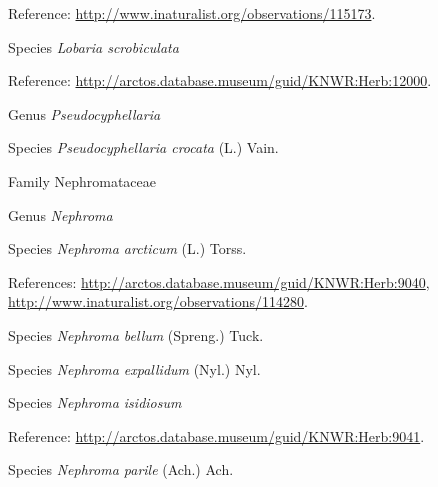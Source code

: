 \documentclass[9pt, article]{memoir}
\begin{document}
\begin{multicols}{2}
\vspace{6pt}Reference: 
\url{http://www.inaturalist.org/observations/115173}.

\vspace{6pt}\noindent\hspace{36pt}Species \textit{Lobaria scrobiculata}


\vspace{6pt}Reference: 
\url{http://arctos.database.museum/guid/KNWR:Herb:12000}.

\vspace{6pt}\noindent\hspace{30pt}Genus \textit{Pseudocyphellaria}


\vspace{6pt}\noindent\hspace{36pt}Species \textit{Pseudocyphellaria crocata} (L.) Vain.


\vspace{6pt}\noindent\hspace{24pt}Family Nephromataceae


\vspace{6pt}\noindent\hspace{30pt}Genus \textit{Nephroma}


\vspace{6pt}\noindent\hspace{36pt}Species \textit{Nephroma arcticum} (L.) Torss.


\vspace{6pt}References: 
\url{http://arctos.database.museum/guid/KNWR:Herb:9040}, 
\url{http://www.inaturalist.org/observations/114280}.

\vspace{6pt}\noindent\hspace{36pt}Species \textit{Nephroma bellum} (Spreng.) Tuck.


\vspace{6pt}\noindent\hspace{36pt}Species \textit{Nephroma expallidum} (Nyl.) Nyl.


\vspace{6pt}\noindent\hspace{36pt}Species \textit{Nephroma isidiosum}


\vspace{6pt}Reference: 
\url{http://arctos.database.museum/guid/KNWR:Herb:9041}.

\vspace{6pt}\noindent\hspace{36pt}Species \textit{Nephroma parile} (Ach.) Ach.



\end{multicols}
\end{document}
